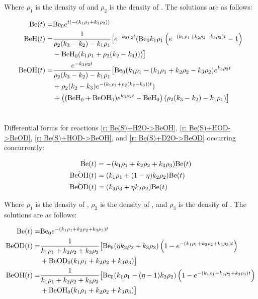 Where $\rho_1$ is the density of  and $\rho_2$ is the density of . The solutions are as follows:

\begin{align}
	\ce{Be}(t) = & \ce{Be0} e^{t (-(k_1 \rho_1+k_2 \rho_2))} \\
	\ce{BeH}(t) = & \frac{1}{\rho_2 (k_3-k_2)-k_1 \rho_1} \big[e^{-k_3 \rho_2 t} (\ce{Be0} k_1 \rho_1 \left(e^{-(k_1 \rho_1+k_2 \rho_2-k_3 \rho_2)t}-1\right) \\
	& -\ce{BeH0} (k_1 \rho_1+\rho_2 (k_2-k_3)))\big] \\
	\ce{BeOH}(t) = & \frac{e^{-k_3 \rho_2 t}}{\rho_2 (k_3-k_2)-k_1 \rho_1} \big[\ce{Be0} (k_1 \rho_1 - (k_1 \rho_1+k_2 \rho_2-k_3 \rho_2) e^{k_3 \rho_2 t} \\
	& +\rho_2 (k_2-k_3) e^{-(k_1 \rho_1+\rho_2 (k_2-k_3))t}) \\
	& +\left((\ce{BeH0}+\ce{BeOH0}) e^{k_3 \rho_2 t}-\ce{BeH0}\right) (\rho_2 (k_3-k_2)-k_1 \rho_1)\big]
\end{align}

\section{} \label{sec: Be+HOD eqs}

Differential forms for reactions \ref{r: Be(S)+H2O->BeOH}, \ref{r: Be(S)+HOD->BeOD}, \ref{r: Be(S)+HOD->BeOH}, and \ref{r: Be(S)+D2O->BeOD} occurring concurrently:

\begin{align}
	\dot{\ce{Be}}(t) & = -(k_1\rho_1+k_2\rho_2+k_3\rho_3)\ce{Be}(t)\\
	\dot{\ce{BeOH}}(t) & = (k_1\rho_1+(1-\eta)k_2\rho_2)\ce{Be}(t)\\
	\dot{\ce{BeOD}}(t) & = (k_3\rho_3+\eta k_2\rho_2)\ce{Be}(t)
\end{align}

Where $\rho_1$ is the density of , $\rho_2$ is the density of , and $\rho_3$ is the density of . The solutions are as follows:

\begin{align}
	\ce{Be}(t) = &  \ce{Be0} e^{-(k_1 \rho_1+k_2 \rho_2+k_3 \rho_3)t} \label{eq: HOD Be(t)} \\
	\ce{BeOD}(t) = & \frac{1}{k_1 \rho_1+k_2 \rho_2+k_3 \rho_3} \big[\ce{Be0} (\eta k_2 \rho_2+k_3 \rho_3) \left(1-e^{-(k_1 \rho_1+k_2 \rho_2+k_3 \rho_3)t}\right) \label{eq: HOD BeOD(t)} \\
	& +\ce{BeOD0} (k_1 \rho_1+k_2 \rho_2+k_3 \rho_3)\big] \\
	\ce{BeOH}(t) = & \frac{1}{k_1 \rho_1+k_2 \rho_2+k_3 \rho_3}\big[\ce{Be0} (k_1 \rho_1-(\eta-1) k_2 \rho_2) \left(1 - e^{-(k_1 \rho_1+k_2 \rho_2+k_3 \rho_3)t}\right) \\
	& + \ce{BeOH0} (k_1 \rho_1+k_2 \rho_2+k_3 \rho_3)\big] \label{eq: HOD BeOH(t)}
\end{align}

